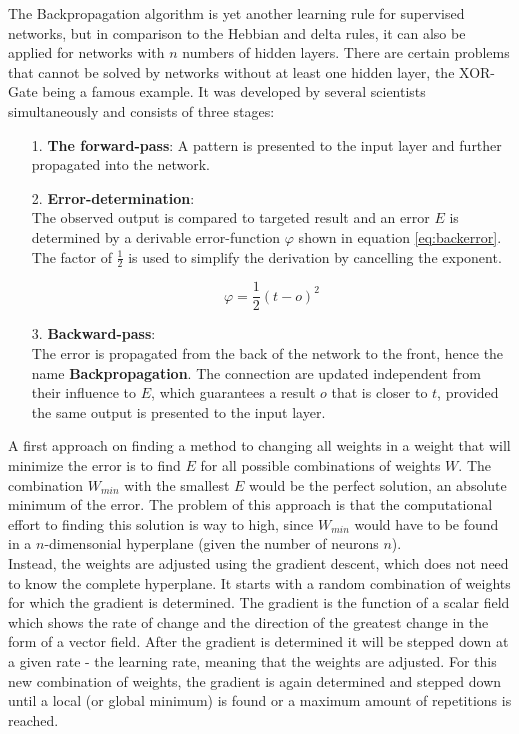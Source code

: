 \documentclass[10pt,a4paper,DIV=11]{scrreprt}
\begin{document}
The Backpropagation algorithm is yet another learning rule for supervised networks, but in comparison to the Hebbian and delta rules, it can also be applied for networks with $n$ numbers of hidden layers. There are certain problems that cannot be solved by networks without at least one hidden layer, the XOR-Gate being a famous example. 
It was developed by several scientists simultaneously \cite{BACK1}\cite{BACK2}\cite{BACK3} and consists of three stages:
\begin{itemize}
\item[1.] \textbf{The forward-pass}:
A pattern is presented to the input layer and further propagated into the network.
\item[2.] \textbf{Error-determination}:\\
The observed output is compared to targeted result and an error $E$ is determined by a derivable error-function $\varphi$ shown in equation \eqref{eq:backerror}. The factor of $\frac{1}{2}$ is used to simplify the derivation by cancelling the exponent.

\begin{equation}
\varphi = \frac{1}{2} (t-o)^2
\label{eq:backerror}
\end{equation}
\item[3.] \textbf{Backward-pass}:\\
The error is propagated from the back of the network to the front, hence the name \textbf{Backpropagation}. The connection are updated independent from their influence to $E$, which guarantees a result $o$ that is closer to $t$, provided the same output is presented to the input layer.
\end{itemize}

A first approach on finding a method to changing all weights in a weight that will minimize the error is to find $E$ for all possible combinations of weights $W$. The combination $W_{min}$ with the smallest $E$ would be the perfect solution, an absolute minimum of the error. The problem of this approach is that the computational effort to finding this solution is way to high, since $W_{min}$ would have to be found in a $n$-dimensonial  hyperplane (given the number of neurons $n$).\\

Instead, the weights are adjusted using the gradient descent, which does not need to know the complete hyperplane. It starts with a random combination of weights for which the gradient is determined. The gradient is the function of a scalar field which shows the rate of change and the direction of the greatest change in the form of a vector field. After the gradient is determined it will be stepped down at a given rate - the learning rate, meaning that the weights are adjusted. For this new combination of weights, the gradient is again determined and stepped down until a local (or global minimum) is found or a maximum amount of repetitions is reached.\\
\end{document}
